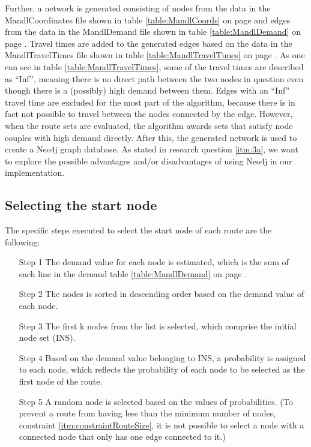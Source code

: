 Further, a network is generated consisting of nodes from the data in the MandlCoordinates file shown in table \ref{table:MandlCoords} on page \pageref{table:MandlCoords} and edges from the data in the MandlDemand file shown in table \ref{table:MandlDemand} on page \pageref{table:MandlDemand}. Travel times are added to the generated edges based on the data in the MandlTravelTimes file shown in table \ref{table:MandlTravelTimes} on page \pageref{table:MandlTravelTimes}. As one can see in table \ref{table:MandlTravelTimes}, some of the travel times are described as ``Inf'', meaning there is no direct path between the two nodes in question even though there is a (possibly) high demand between them. Edges with an ``Inf'' travel time are excluded for the most part of the algorithm, because there is in fact not possible to travel between the nodes connected by the edge. However, when the route sets are evaluated, the algorithm awards sets that satisfy node couples with high demand directly. After this, the generated network is used to create a Neo4j graph database. As stated in research question \ref{itm:3a}, we want to explore the possible advantages and/or disadvantages of using Neo4j in our implementation.



\subsection{Selecting the start node}
The specific steps executed to select the start node of each route are the following:
\begin{itemize}
\item[Step 1] The demand value for each node is estimated, which is the sum of each line in the demand table \ref{table:MandlDemand} on page \pageref{table:MandlDemand}. 
\item[Step 2] The nodes is sorted in descending order based on the demand value of each node.
\item[Step 3] The first k nodes from the list is selected, which comprise the initial node set (INS). 
\item[Step 4] Based on the demand value belonging to INS, a probability is assigned to each node, which reflects the probability of each node to be selected as the first node of the route. 
\item[Step 5] A random node is selected based on the values of probabilities. (To prevent a route from having less than the minimum number of nodes, constraint \ref{itm:constraintRouteSize}, it is not possible to select a node with a connected node that only has one edge connected to it.)
\end{itemize}

